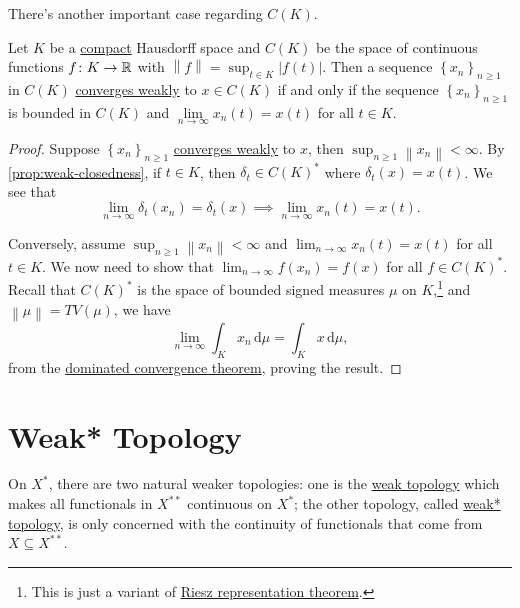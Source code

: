 There's another important case regarding \(C(K)\).

\begin{theorem}\label{thm:weak-convergence-in-CK}
	Let \(K\) be a \hyperref[def:compact]{compact} Hausdorff space and \(C(K)\) be the space of continuous functions \(f\colon K\to \mathbb{\MakeUppercase{r}} \) with \(\left\lVert f\right\rVert = \sup _{t\in K} \left\vert f(t) \right\vert \). Then a sequence \(\left\{ x_n \right\}_{n \geq 1} \) in \(C(K)\) \hyperref[def:weakly-convergence]{converges weakly} to \(x\in C(K)\)  if and only if the sequence \(\left\{ x_n \right\} _{n\geq 1}\) is bounded in \(C(K)\) and \(\lim\limits_{n \to \infty} x_n(t)=x(t)\) for all \(t\in K\).
\end{theorem}
\begin{proof}
	Suppose \(\left\{ x_n \right\} _{n \geq 1}\) \hyperref[def:weakly-convergence]{converges weakly} to \(x\), then \(\sup _{n\geq 1} \left\lVert x_n\right\rVert < \infty \). By \autoref{prop:weak-closedness}, if \(t\in K\), then \(\delta _t\in C(K)^{\ast} \) where \(\delta _t(x) = x(t)\). We see that
	\[
		\lim_{n \to \infty} \delta _t(x_n) = \delta _t(x)\implies \lim_{n \to \infty} x_n(t) = x(t).
	\]

	Conversely, assume \(\sup _{n\geq 1}\left\lVert x_n\right\rVert < \infty \) and \(\lim_{n \to \infty} x_n(t) = x(t)\) for all \(t\in K\). We now need to show that \(\lim_{n \to \infty} f(x_{n} ) = f(x)\) for all \(f\in C(K)^{\ast} \). Recall that \(C(K)^{\ast} \) is the space of bounded signed measures \(\mu \) on \(K\),\footnote{This is just a variant of \hyperref[thm:Riesz-representation]{Riesz representation theorem}.} and \(\left\lVert \mu \right\rVert = TV(\mu )\), we have
	\[
		\lim_{n \to \infty} \int _K x_n \,\mathrm{d} \mu = \int_K x \,\mathrm{d} \mu,
	\]
	from the \href{https://en.wikipedia.org/wiki/Dominated_convergence_theorem}{dominated convergence theorem}, proving the result.
\end{proof}

\section{Weak* Topology}
On \(X^{\ast} \), there are two natural weaker topologies: one is the \hyperref[def:weak-topology]{weak topology} which makes all functionals in \(X^{\ast\ast} \) continuous on \(X^{\ast} \); the other topology, called \hyperref[def:weak*-topology]{weak* topology}, is only concerned with the continuity of functionals that come from \(X \subseteq X^{\ast\ast} \).

